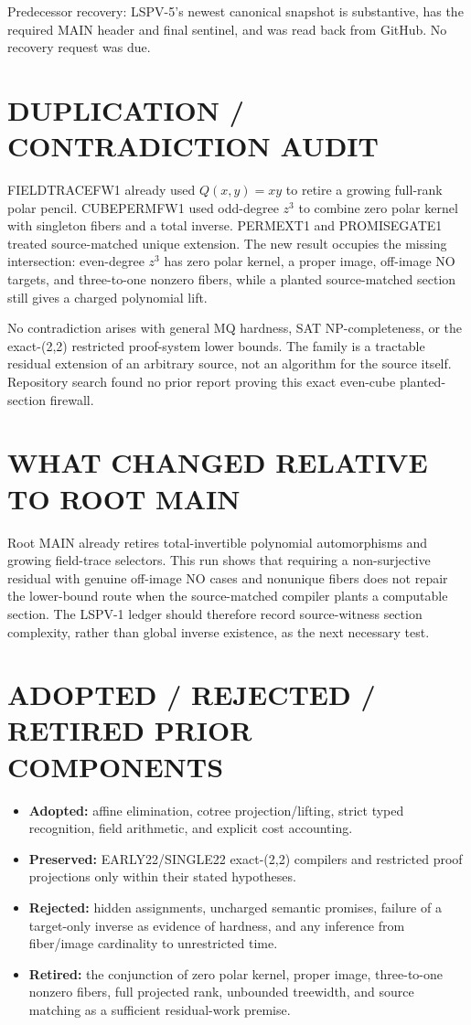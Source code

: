 \documentclass[11pt]{article}
\begin{document}
Predecessor recovery: LSPV-5's newest canonical snapshot
 is substantive,
has the required MAIN header and final sentinel, and was read back from
GitHub.  No recovery request was due.

\section{DUPLICATION / CONTRADICTION AUDIT}
FIELDTRACEFW1 already used $Q(x,y)=xy$ to retire a growing full-rank polar
pencil.  CUBEPERMFW1 used odd-degree $z^3$ to combine zero polar kernel with
singleton fibers and a total inverse.  PERMEXT1 and PROMISEGATE1 treated
source-matched unique extension.  The new result occupies the missing
intersection: even-degree $z^3$ has zero polar kernel, a proper image,
off-image NO targets, and three-to-one nonzero fibers, while a planted
source-matched section still gives a charged polynomial lift.

No contradiction arises with general MQ hardness, SAT NP-completeness, or
the exact-(2,2) restricted proof-system lower bounds.  The family is a
tractable residual extension of an arbitrary source, not an algorithm for the
source itself.  Repository search found no prior report proving this exact
even-cube planted-section firewall.

\section{WHAT CHANGED RELATIVE TO ROOT MAIN}
Root MAIN already retires total-invertible polynomial automorphisms and
growing field-trace selectors.  This run shows that requiring a non-surjective
residual with genuine off-image NO cases and nonunique fibers does not repair
the lower-bound route when the source-matched compiler plants a computable
section.  The LSPV-1 ledger should therefore record source-witness section
complexity, rather than global inverse existence, as the next necessary test.

\section{ADOPTED / REJECTED / RETIRED PRIOR COMPONENTS}
\begin{itemize}
\item \textbf{Adopted:} affine elimination, cotree projection/lifting,
strict typed recognition, field arithmetic, and explicit cost accounting.
\item \textbf{Preserved:} EARLY22/SINGLE22 exact-(2,2) compilers and
restricted proof projections only within their stated hypotheses.
\item \textbf{Rejected:} hidden assignments, uncharged semantic promises,
failure of a target-only inverse as evidence of hardness, and any inference
from fiber/image cardinality to unrestricted time.
\item \textbf{Retired:} the conjunction of zero polar kernel, proper image,
three-to-one nonzero fibers, full projected rank, unbounded treewidth, and
source matching as a sufficient residual-work premise.
\end{itemize}
\end{document}
